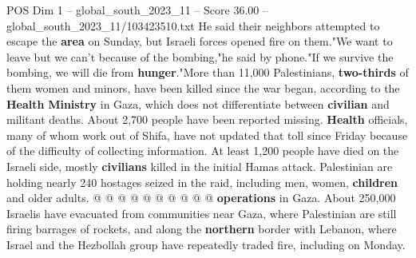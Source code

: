 \begin{textsample}{POS Dim 1 – global\_south\_2023\_11 – Score 36.00 – global\_south\_2023\_11/103423510.txt}
He said their neighbors attempted to escape the \textbf{area} on Sunday, but Israeli forces opened fire on them."We want to leave but we can't because of the bombing,"he said by phone."If we survive the bombing, we will die from \textbf{hunger}."More than 11,000 Palestinians, \textbf{two-thirds} of them women and minors, have been killed since the war began, according to the \textbf{Health} \textbf{Ministry} in Gaza, which does not differentiate between \textbf{civilian} and militant deaths.
About 2,700 people have been reported missing. \textbf{Health} officials, many of whom work out of Shifa, have not updated that toll since Friday because of the difficulty of collecting information.
At least 1,200 people have died on the Israeli side, mostly \textbf{civilians} killed in the initial Hamas attack.
Palestinian are holding nearly 240 hostages seized in the raid, including men, women, \textbf{children} and older adults. @ @ @ @ @ @ @ @ @ @ \textbf{operations} in Gaza.
About 250,000 Israelis have evacuated from communities near Gaza, where Palestinian are still firing barrages of rockets, and along the \textbf{northern} border with Lebanon, where Israel and the Hezbollah group have repeatedly traded fire, including on Monday.

\end{textsample}
